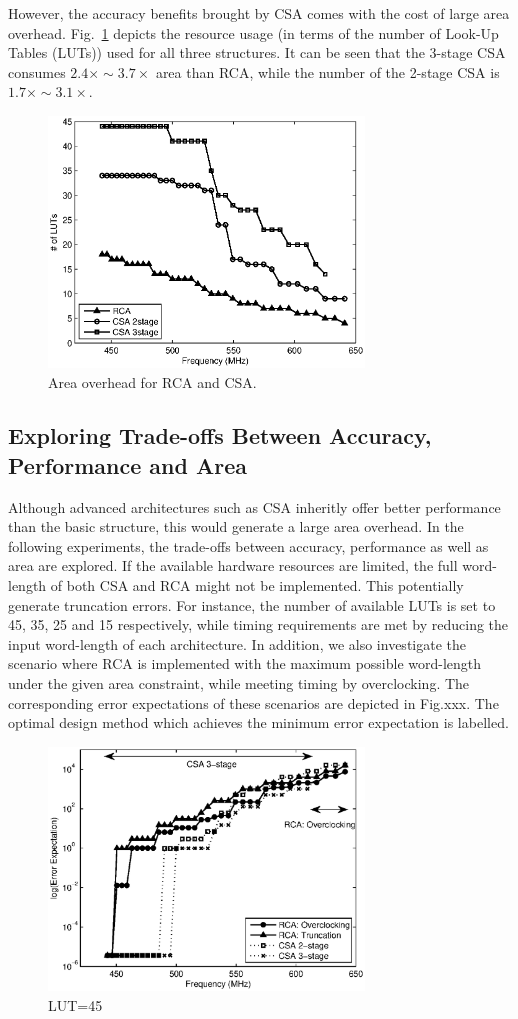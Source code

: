 \documentclass[journal]{IEEEtran}
\begin{document}
However, the accuracy benefits brought by CSA comes with the cost of large area overhead. Fig.~\ref{CSA3stage Area} depicts the resource usage (in terms of the number of Look-Up Tables (LUTs)) used for all three structures. It can be seen that the 3-stage CSA consumes $2.4\times\sim3.7\times$ area than RCA, while the number of the 2-stage CSA is $1.7\times\sim3.1\times$. 
\begin{figure}[htbp]
  \centering
  \includegraphics[width=3.3in]{./Figures/CSA3stage_Area.eps}
  \caption{Area overhead for RCA and CSA.}
  \label{CSA3stage Area}
\end{figure}

\subsection{Exploring Trade-offs Between Accuracy, Performance and Area}
Although advanced architectures such as CSA inheritly offer better performance than the basic structure, this would generate a large area overhead. In the following experiments, the trade-offs between accuracy, performance as well as area are explored. If the available hardware resources are limited, the full word-length of both CSA and RCA might not be implemented. This potentially generate truncation errors. For instance, the number of available LUTs is set to 45, 35, 25 and 15 respectively, while timing requirements are met by reducing the input word-length of each architecture. In addition, we also investigate the scenario where RCA is implemented with the maximum possible word-length under the given area constraint, while meeting timing by overclocking. The corresponding error expectations of these scenarios are depicted in Fig.xxx. The optimal design method which achieves the minimum error expectation is labelled.
\begin{figure}[htbp]
	\centering
	\includegraphics[width=3.3in]{./Figures/Error_LUT45.eps}
	\caption{LUT=45}
\end{figure}
\end{document}
